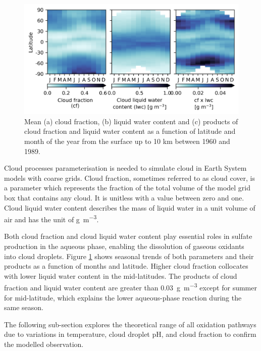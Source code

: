 \begin{figure}
    \centering
    \includegraphics{Chapter4/Figs/seasonal_cf_lwc_histsst_pothole.png}
    \caption[Mean cloud fraction and liquid water content below 10 km between 1960 and 1989]{Mean (a) cloud fraction, (b) liquid water content and (c) products of cloud fraction and liquid water content as a function of latitude and month of the year from the surface up to 10 km between 1960 and 1989.}
    \label{fig:ch4:seasonal-cf-lwc}
\end{figure}

Cloud processes parameterisation is needed to simulate cloud in Earth System models with coarse grids. Cloud fraction, sometimes referred to as cloud cover, is a parameter which represents the fraction of the total volume of the model grid box that contains any cloud. It is unitless with a value between zero and one. Cloud liquid water content describes the mass of liquid water in a unit volume of air and has the unit of \unit{\gram\per\cubic\metre}.

Both cloud fraction and cloud liquid water content play essential roles in sulfate production in the aqueous phase, enabling the dissolution of gaseous oxidants into cloud droplets. Figure \ref{fig:ch4:seasonal-cf-lwc} shows seasonal trends of both parameters and their products as a function of months and latitude. Higher cloud fraction collocates with lower liquid water content in the mid-latitudes. The products of cloud fraction and liquid water content are greater than \qty{0.03}{\gram\per\cubic\metre} except for summer for mid-latitude, which explains the lower aqueous-phase reaction during the same season. 

The following sub-section explores the theoretical range of all oxidation pathways due to variations in temperature, cloud droplet pH, and cloud fraction to confirm the modelled observation.

